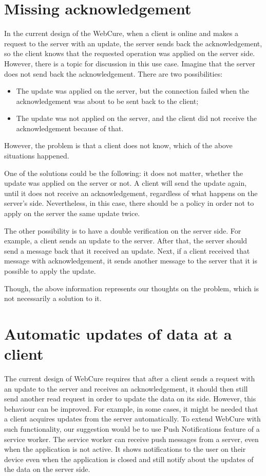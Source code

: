 \section*{Missing acknowledgement}

In the current design of the WebCure, when a client is online and makes a request to the server with an update, the server sends back the acknowledgement, so the client knows that the requested operation was applied on the server side. However, there is a topic for discussion in this use case. Imagine that the server does not send back the acknowledgement. There are two possibilities:

\begin{itemize}
    \item {The update was applied on the server, but the connection failed when the acknowledgement was about to be sent back to the client;}
    \item {The update was not applied on the server, and the client did not receive the acknowledgement because of that.}
\end{itemize}

However, the problem is that a client does not know, which of the above situations happened. 

One of the solutions could be the following: it does not matter, whether the update was applied on the server or not. A client will send the update again, until it does not receive an acknowledgement, regardless of what happens on the server's side. Nevertheless, in this case, there should be a policy in order not to apply on the server the same update twice.

The other possibility is to have a double verification on the server side. For example, a client sends an update to the server. After that, the server should send a message back that it received an update. Next, if a client received that message with acknowledgement, it sends another message to the server that it is possible to apply the update. 

Though, the above information represents our thoughts on the problem, which is not necessarily a solution to it.  

\section*{Automatic updates of data at a client}

The current design of WebCure requires that after a client sends a request with an update to the server and receives an acknowledgement, it should then still send another read request in order to update the data on its side. However, this behaviour can be improved. For example, in some cases, it might be needed that a client acquires updates from the server automatically. To extend WebCure with such functionality, our suggestion would be to use Push Notifications feature\cite{32} of a service worker. The service worker can receive push messages from a server, even when the application is not active. It shows notifications to the user on their device even when the application is closed and still notify about the updates of the data on the server side.

